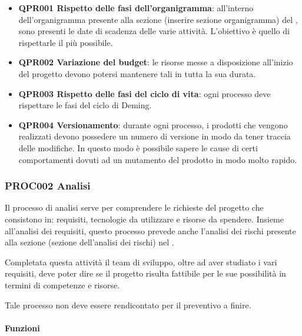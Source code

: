 		\begin{itemize} 
			\item \textbf{QPR001 Rispetto delle fasi dell'organigramma}: all'interno dell'organigramma presente alla sezione (inserire sezione organigramma) del \Doc{\PdPv}, sono presenti le date di scadenza delle varie attività. L'obiettivo è quello di rispettarle il più possibile.
			\item \textbf{QPR002 Variazione del budget}: le risorse messe a disposizione all'inizio del progetto devono potersi mantenere tali in tutta la sua durata.
			\item \textbf{QPR003 Rispetto delle fasi del ciclo di vita}: ogni processo deve rispettare le fasi del ciclo di Deming.
			\item \textbf{QPR004 Versionamento}: durante ogni processo, i prodotti che vengono realizzati devono possedere un numero di versione in modo da tener traccia delle modifiche. In questo modo è possibile sapere le cause di certi comportamenti dovuti ad un mutamento del prodotto in modo molto rapido.  
		\end{itemize}
	
	\subsubsection{PROC002 Analisi}
	Il processo di analisi serve per comprendere le richieste del progetto che consistono in: requisiti, tecnologie da utilizzare e risorse da spendere. Insieme all'analisi dei requisiti, questo processo prevede anche l'analisi dei rischi presente alla sezione (sezione dell'analisi dei rischi) nel \Doc{\PdPv}.
	
	Completata questa attività il team di sviluppo, oltre ad aver studiato i vari requisiti, deve poter dire se il progetto risulta fattibile per le sue possibilità in termini di competenze e risorse.
	
	Tale processo non deve essere rendicontato per il preventivo a finire.
	
		\paragraph*{Funzioni}
		

